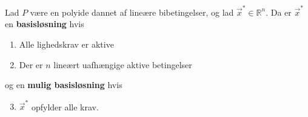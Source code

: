
\begin{defn}[Basisløsning]
Lad $P$ være en polyide dannet af lineære bibetingelser, og lad $\vec{x}^*\in \mathds{R}^n$. Da er $\vec{x}^*$ en \textbf{basisløsning} hvis
\begin{enumerate}[label=(\alph*)]
\item Alle lighedskrav er aktive
\item Der er $n$ lineært uafhængige aktive betingelser
\end{enumerate}
og en \textbf{mulig basisløsning} hvis
\begin{enumerate}[label=(\alph*)]
\setcounter{enumi}{2}
\item $\vec{x}^*$ opfylder alle krav.
\end{enumerate}
\label{def:basislosning}
\end{defn}

